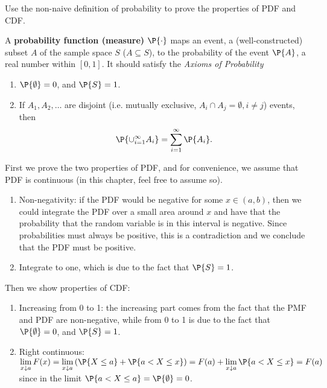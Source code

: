 \begin{exercise} 
		Use the non-naive definition of probability to prove the properties of PDF and CDF.
		\begin{hint}
			A \textbf{probability function (measure)} $\P{\cdot}$ maps an event, a (well-constructed) subset $A$ of the sample space $S$ ($A\subseteq S$), to the probability of the event $\P{A}$, a real number within $[0,1]$. It should satisfy the \emph{Axioms of Probability} 
			\begin{enumerate}
				\item $\P{\emptyset}=0$, and $\P{S}=1$.
				\item If $A_{1},A_{2},\ldots $ are disjoint (i.e. mutually exclusive, $A_i\cap A_j=\emptyset, i\neq j$) events, then
				\begin{equation*}
					\P{\cup_{i=1}^{\infty}A_{i}} = \sum_{i=1}^{\infty}\P{A_{i}}.
				\end{equation*}
			\end{enumerate}
		\end{hint}
		\begin{solution}
			First we prove the two properties of PDF, and for convenience, we assume that PDF is continuous (in this chapter, feel free to assume so).
			\begin{enumerate}
				\item Non-negativity: if the PDF would be negative for some $x\in (a,b)$, then we could integrate the PDF over a small area around $x$ and have that the probability that the random variable is in this interval is negative. Since probabilities must always be positive, this is a contradiction and we conclude that the PDF must be positive.
				\item Integrate to one, which is due to the fact that $\P{S}=1$.
			\end{enumerate}
			Then we show properties of CDF:
			\begin{enumerate}
				\item Increasing from 0 to 1: the increasing part comes from the fact that the PMF and PDF are non-negative, while from 0 to 1 is due to the fact that  $\P{\emptyset}=0$, and $\P{S}=1$.
				\item Right continuous: $\lim\limits_{x\downarrow a}F(x)=\lim\limits_{x\downarrow a}\left(\P{X\leq a}+\P{a<X\leq x} \right) =F(a) + \lim\limits_{x\downarrow a}\P{a<X\leq x}=F(a)$ since in the limit $\P{a<X\leq a}=\P{\emptyset}=0$.
			\end{enumerate}
		\end{solution}
	\end{exercise}

